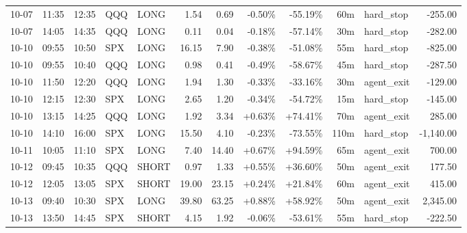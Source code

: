 \documentclass[11pt,a4paper,twoside]{article}
\begin{document}
\begin{center}
\begin{longtable}{>{\color{txtmain}}l l l l l r r r r r >{\color{txtmain}}l r}
10-07 & 11:35 & 12:35 & QQQ & LONG & 1.54 & 0.69 & \textcolor{lossred}{-0.50\%} & \textcolor{lossred}{-55.19\%} & 60m & hard\_stop & \textcolor{lossred}{-255.00} \\
10-07 & 14:05 & 14:35 & QQQ & LONG & 0.11 & 0.04 & \textcolor{lossred}{-0.18\%} & \textcolor{lossred}{-57.14\%} & 30m & hard\_stop & \textcolor{lossred}{-282.00} \\
10-10 & 09:55 & 10:50 & SPX & LONG & 16.15 & 7.90 & \textcolor{lossred}{-0.38\%} & \textcolor{lossred}{-51.08\%} & 55m & hard\_stop & \textcolor{lossred}{-825.00} \\
10-10 & 09:55 & 10:40 & QQQ & LONG & 0.98 & 0.41 & \textcolor{lossred}{-0.49\%} & \textcolor{lossred}{-58.67\%} & 45m & hard\_stop & \textcolor{lossred}{-287.50} \\
10-10 & 11:50 & 12:20 & QQQ & LONG & 1.94 & 1.30 & \textcolor{lossred}{-0.33\%} & \textcolor{lossred}{-33.16\%} & 30m & agent\_exit & \textcolor{lossred}{-129.00} \\
10-10 & 12:15 & 12:30 & SPX & LONG & 2.65 & 1.20 & \textcolor{lossred}{-0.34\%} & \textcolor{lossred}{-54.72\%} & 15m & hard\_stop & \textcolor{lossred}{-145.00} \\
10-10 & 13:15 & 14:25 & QQQ & LONG & 1.92 & 3.34 & \textcolor{wingreen}{+0.63\%} & \textcolor{wingreen}{+74.41\%} & 70m & agent\_exit & \textcolor{wingreen}{285.00} \\
10-10 & 14:10 & 16:00 & SPX & LONG & 15.50 & 4.10 & \textcolor{lossred}{-0.23\%} & \textcolor{lossred}{-73.55\%} & 110m & hard\_stop & \textcolor{lossred}{-1,140.00} \\
10-11 & 10:05 & 11:10 & SPX & LONG & 7.40 & 14.40 & \textcolor{wingreen}{+0.67\%} & \textcolor{wingreen}{+94.59\%} & 65m & agent\_exit & \textcolor{wingreen}{700.00} \\
10-12 & 09:45 & 10:35 & QQQ & SHORT & 0.97 & 1.33 & \textcolor{wingreen}{+0.55\%} & \textcolor{wingreen}{+36.60\%} & 50m & agent\_exit & \textcolor{wingreen}{177.50} \\
10-12 & 12:05 & 13:05 & SPX & SHORT & 19.00 & 23.15 & \textcolor{wingreen}{+0.24\%} & \textcolor{wingreen}{+21.84\%} & 60m & agent\_exit & \textcolor{wingreen}{415.00} \\
10-13 & 09:40 & 10:30 & SPX & LONG & 39.80 & 63.25 & \textcolor{wingreen}{+0.88\%} & \textcolor{wingreen}{+58.92\%} & 50m & agent\_exit & \textcolor{wingreen}{2,345.00} \\
10-13 & 13:50 & 14:45 & SPX & SHORT & 4.15 & 1.92 & \textcolor{lossred}{-0.06\%} & \textcolor{lossred}{-53.61\%} & 55m & hard\_stop & \textcolor{lossred}{-222.50} \\

\end{longtable}
\end{center}
\end{document}
